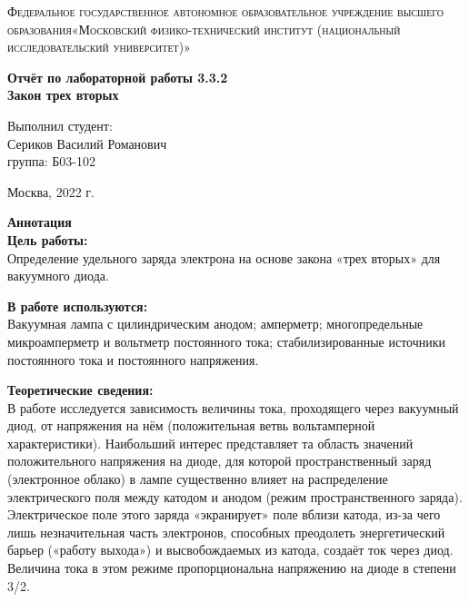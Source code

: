 \documentclass[a4paper, 12pt]{article}%
\begin{document}
	\begin{titlepage}
		\begin{center}
			\textsc{Федеральное государственное автономное образовательное учреждение высшего образования«Московский физико-технический институт (национальный исследовательский университет)»\\[5mm]
			}
			
			\vfill
			
			\textbf{Отчёт по лабораторной работы 3.3.2\\[3mm]
				Закон трех вторых
				\\[50mm]
			}
			
		\end{center}
		
		\hfill
		\begin{minipage}{.5\textwidth}
			Выполнил студент:\\[2mm]
			Сериков Василий Романович\\[2mm]
			группа: Б03-102\\[5mm]
			
		\end{minipage}
		\vfill
		\begin{center}
			Москва, 2022 г.
		\end{center}
		
	\end{titlepage}
	
	\newpage
	\textbf{Аннотация}\\
	
	
	\textbf{Цель работы: }\\
	
	Определение удельного заряда электрона на основе закона
	«трех вторых» для вакуумного диода.
	
	\textbf{В работе используются: }\\
	
	Вакуумная лампа с цилиндрическим анодом;
	амперметр; многопредельные микроамперметр и вольтметр постоянного
	тока; стабилизированные источники постоянного тока и постоянного напряжения.
	
	
	\textbf{Теоретические сведения: } \\
	
	
	В работе исследуется зависимость величины тока, проходящего через
	вакуумный диод, от напряжения на нём (положительная ветвь вольтамперной характеристики). Наибольший интерес представляет та область значений положительного напряжения на диоде, для которой пространственный заряд (электронное облако) в лампе существенно влияет на распределение электрического поля между катодом и анодом (режим пространственного заряда). Электрическое поле этого заряда «экранирует» поле вблизи катода, из-за чего лишь незначительная часть электронов, способных преодолеть энергетический барьер («работу выхода») и высвобождаемых из катода, создаёт ток через диод. Величина тока в этом режиме пропорциональна напряжению на диоде в степени 3/2.
	
\end{document}
